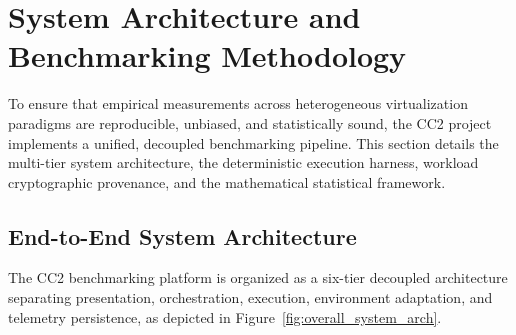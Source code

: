 \section{System Architecture and Benchmarking Methodology}
\label{sec:system_architecture}

To ensure that empirical measurements across heterogeneous virtualization paradigms are reproducible, unbiased, and statistically sound, the CC2 project implements a unified, decoupled benchmarking pipeline. This section details the multi-tier system architecture, the deterministic execution harness, workload cryptographic provenance, and the mathematical statistical framework.

\subsection{End-to-End System Architecture}
\label{subsec:e2e_architecture}

The CC2 benchmarking platform is organized as a six-tier decoupled architecture separating presentation, orchestration, execution, environment adaptation, and telemetry persistence, as depicted in Figure~\ref{fig:overall_system_arch}.

